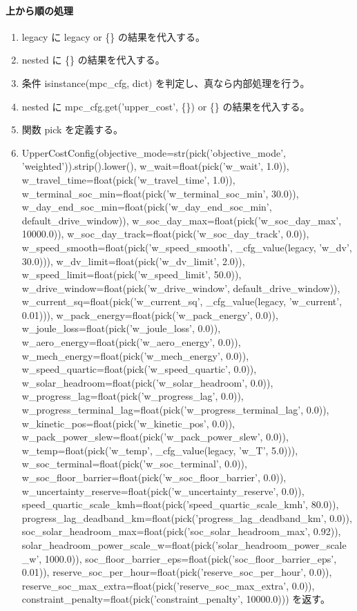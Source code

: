\documentclass[a4paper,11pt]{article}
\begin{document}
            \paragraph{上から順の処理}
            \begin{enumerate}[leftmargin=1.8em]
            \item legacy に legacy or \{\} の結果を代入する。
\item nested に \{\} の結果を代入する。
\item 条件 isinstance(mpc\_cfg, dict) を判定し、真なら内部処理を行う。
\item   nested に mpc\_cfg.get('upper\_cost', \{\}) or \{\} の結果を代入する。
\item 関数 pick を定義する。
\item UpperCostConfig(objective\_mode=str(pick('objective\_mode', 'weighted')).strip().lower(), w\_wait=float(pick('w\_wait', 1.0)), w\_travel\_time=float(pick('w\_travel\_time', 1.0)), w\_terminal\_soc\_min=float(pick('w\_terminal\_soc\_min', 30.0)), w\_day\_end\_soc\_min=float(pick('w\_day\_end\_soc\_min', default\_drive\_window)), w\_soc\_day\_max=float(pick('w\_soc\_day\_max', 10000.0)), w\_soc\_day\_track=float(pick('w\_soc\_day\_track', 0.0)), w\_speed\_smooth=float(pick('w\_speed\_smooth', \_cfg\_value(legacy, 'w\_dv', 30.0))), w\_dv\_limit=float(pick('w\_dv\_limit', 2.0)), w\_speed\_limit=float(pick('w\_speed\_limit', 50.0)), w\_drive\_window=float(pick('w\_drive\_window', default\_drive\_window)), w\_current\_sq=float(pick('w\_current\_sq', \_cfg\_value(legacy, 'w\_current', 0.01))), w\_pack\_energy=float(pick('w\_pack\_energy', 0.0)), w\_joule\_loss=float(pick('w\_joule\_loss', 0.0)), w\_aero\_energy=float(pick('w\_aero\_energy', 0.0)), w\_mech\_energy=float(pick('w\_mech\_energy', 0.0)), w\_speed\_quartic=float(pick('w\_speed\_quartic', 0.0)), w\_solar\_headroom=float(pick('w\_solar\_headroom', 0.0)), w\_progress\_lag=float(pick('w\_progress\_lag', 0.0)), w\_progress\_terminal\_lag=float(pick('w\_progress\_terminal\_lag', 0.0)), w\_kinetic\_pos=float(pick('w\_kinetic\_pos', 0.0)), w\_pack\_power\_slew=float(pick('w\_pack\_power\_slew', 0.0)), w\_temp=float(pick('w\_temp', \_cfg\_value(legacy, 'w\_T', 5.0))), w\_soc\_terminal=float(pick('w\_soc\_terminal', 0.0)), w\_soc\_floor\_barrier=float(pick('w\_soc\_floor\_barrier', 0.0)), w\_uncertainty\_reserve=float(pick('w\_uncertainty\_reserve', 0.0)), speed\_quartic\_scale\_kmh=float(pick('speed\_quartic\_scale\_kmh', 80.0)), progress\_lag\_deadband\_km=float(pick('progress\_lag\_deadband\_km', 0.0)), soc\_solar\_headroom\_max=float(pick('soc\_solar\_headroom\_max', 0.92)), solar\_headroom\_power\_scale\_w=float(pick('solar\_headroom\_power\_scale\_w', 1000.0)), soc\_floor\_barrier\_eps=float(pick('soc\_floor\_barrier\_eps', 0.01)), reserve\_soc\_per\_hour=float(pick('reserve\_soc\_per\_hour', 0.0)), reserve\_soc\_max\_extra=float(pick('reserve\_soc\_max\_extra', 0.0)), constraint\_penalty=float(pick('constraint\_penalty', 10000.0))) を返す。
            \end{enumerate}
\end{document}

